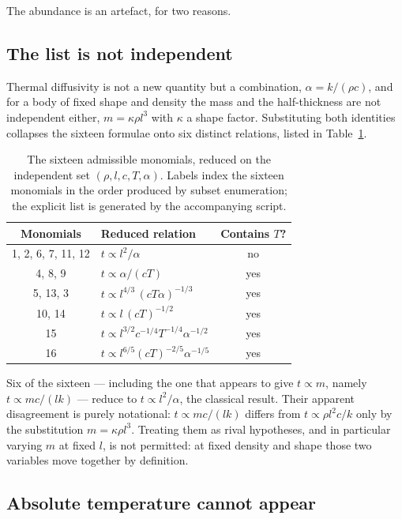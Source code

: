 The abundance is an artefact, for two reasons.

\subsection{The list is not independent}

Thermal diffusivity is not a new quantity but a combination,
$\alpha = k/(\rho c)$, and for a body of fixed shape and density the mass
and the half-thickness are not independent either, $m = \kappa\rho l^{3}$
with $\kappa$ a shape factor. Substituting both identities collapses the
sixteen formulae onto six distinct relations, listed in
Table~\ref{tab:collapse}.

\begin{table}[htbp]
\centering
\caption{The sixteen admissible monomials, reduced on the independent set
$(\rho,l,c,T,\alpha)$. Labels index the sixteen monomials in the order
produced by subset enumeration; the explicit list is generated by the
accompanying script.}
\label{tab:collapse}
\begin{tabular}{clc}
\toprule
Monomials & Reduced relation & Contains $T$?\\
\midrule
1, 2, 6, 7, 11, 12 & $t \propto l^{2}/\alpha$ & no\\
4, 8, 9 & $t \propto \alpha/(cT)$ & yes\\
5, 13, 3 & $t \propto l^{4/3}\,(cT\alpha)^{-1/3}$ & yes\\
10, 14 & $t \propto l\,(cT)^{-1/2}$ & yes\\
15 & $t \propto l^{3/2}c^{-1/4}T^{-1/4}\alpha^{-1/2}$ & yes\\
16 & $t \propto l^{6/5}(cT)^{-2/5}\alpha^{-1/5}$ & yes\\
\bottomrule
\end{tabular}
\end{table}

Six of the sixteen --- including the one that appears to give
$t \propto m$, namely $t \propto mc/(lk)$ --- reduce to $t\propto
l^{2}/\alpha$, the classical result. Their apparent disagreement is purely
notational: $t \propto mc/(lk)$ differs from $t \propto \rho l^{2}c/k$ only
by the substitution $m=\kappa\rho l^{3}$. Treating them as rival
hypotheses, and in particular varying $m$ at fixed $l$, is not permitted:
at fixed density and shape those two variables move together by
definition.

\subsection{Absolute temperature cannot appear}

